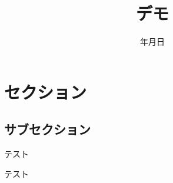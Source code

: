 \documentclass{sotsu-beamer}
\begin{document}
\title{デモ}
\date{\number\year 年\number\month 月\number\day 日}


\begin{frame}

    \maketitle

\end{frame}


\section{セクション}

\subsection{サブセクション}


\begin{frame}{テスト}

    テスト

\end{frame}
\end{document}
